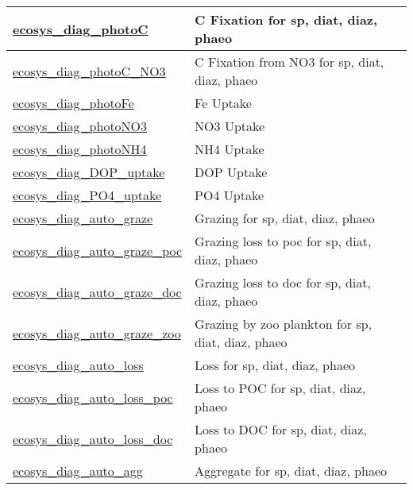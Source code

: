 {\begin{center}
\begin{longtable}{| p{2.0in} | p{4.0in} |}
    \hline
    \hyperref[subsec:var_sec_forcing_ecosys_diag_photoC]{ecosys\_diag\_photoC} & C Fixation for sp, diat, diaz, phaeo \\
    \hline
    \hyperref[subsec:var_sec_forcing_ecosys_diag_photoC_NO3]{ecosys\_diag\_photoC\_NO3} & C Fixation from NO3 for sp, diat, diaz, phaeo \\
    \hline
    \hyperref[subsec:var_sec_forcing_ecosys_diag_photoFe]{ecosys\_diag\_photoFe} & Fe Uptake \\
    \hline
    \hyperref[subsec:var_sec_forcing_ecosys_diag_photoNO3]{ecosys\_diag\_photoNO3} & NO3 Uptake \\
    \hline
    \hyperref[subsec:var_sec_forcing_ecosys_diag_photoNH4]{ecosys\_diag\_photoNH4} & NH4 Uptake \\
    \hline
    \hyperref[subsec:var_sec_forcing_ecosys_diag_DOP_uptake]{ecosys\_diag\_DOP\_uptake} & DOP Uptake \\
    \hline
    \hyperref[subsec:var_sec_forcing_ecosys_diag_PO4_uptake]{ecosys\_diag\_PO4\_uptake} & PO4 Uptake \\
    \hline
    \hyperref[subsec:var_sec_forcing_ecosys_diag_auto_graze]{ecosys\_diag\_auto\_graze} & Grazing for sp, diat, diaz, phaeo \\
    \hline
    \hyperref[subsec:var_sec_forcing_ecosys_diag_auto_graze_poc]{ecosys\_diag\_auto\_graze\_poc} & Grazing loss to poc for sp, diat, diaz, phaeo \\
    \hline
    \hyperref[subsec:var_sec_forcing_ecosys_diag_auto_graze_doc]{ecosys\_diag\_auto\_graze\_doc} & Grazing loss to doc for sp, diat, diaz, phaeo \\
    \hline
    \hyperref[subsec:var_sec_forcing_ecosys_diag_auto_graze_zoo]{ecosys\_diag\_auto\_graze\_zoo} & Grazing by zoo plankton for sp, diat, diaz, phaeo \\
    \hline
    \hyperref[subsec:var_sec_forcing_ecosys_diag_auto_loss]{ecosys\_diag\_auto\_loss} & Loss for sp, diat, diaz, phaeo \\
    \hline
    \hyperref[subsec:var_sec_forcing_ecosys_diag_auto_loss_poc]{ecosys\_diag\_auto\_loss\_poc} & Loss to POC for sp, diat, diaz, phaeo \\
    \hline
    \hyperref[subsec:var_sec_forcing_ecosys_diag_auto_loss_doc]{ecosys\_diag\_auto\_loss\_doc} & Loss to DOC for sp, diat, diaz, phaeo \\
    \hline
    \hyperref[subsec:var_sec_forcing_ecosys_diag_auto_agg]{ecosys\_diag\_auto\_agg} & Aggregate for sp, diat, diaz, phaeo \\

\end{longtable}
\end{center}}
